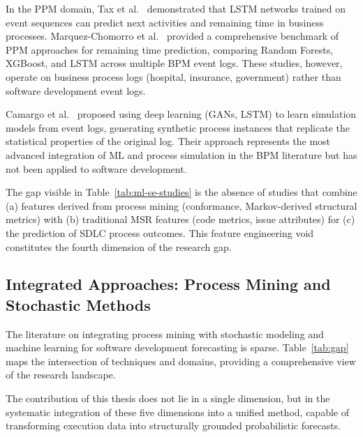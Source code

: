 In the PPM domain, Tax et al.~\cite{tax2017} demonstrated
that LSTM networks trained on event sequences can predict next activities
and remaining time in business processes. Marquez-Chomorro et
al.~\cite{marquezChamorro2018} provided a comprehensive
benchmark of PPM approaches for remaining time prediction, comparing
Random Forests, XGBoost, and LSTM across multiple BPM event logs.
These studies, however, operate on business process logs (hospital,
insurance, government) rather than software development event logs.

Camargo et al.~\cite{camargo2022learning} proposed using deep learning
(GANs, LSTM) to learn simulation models from event logs, generating
synthetic process instances that replicate the statistical properties
of the original log. Their approach represents the most advanced
integration of ML and process simulation in the BPM literature but has
not been applied to software development.

The gap visible in Table~\ref{tab:ml-se-studies} is the absence of
studies that combine (a) features derived from process mining
(conformance, Markov-derived structural metrics) with (b) traditional
MSR features (code metrics, issue attributes) for (c) the prediction of
SDLC process outcomes. This feature engineering void constitutes the
fourth dimension of the research gap.


\subsection{Integrated Approaches: Process Mining and Stochastic Methods}
\label{sec:rw-integrated}

The literature on integrating process mining with stochastic modeling
and machine learning for software development forecasting is sparse.
Table~\ref{tab:gap} maps the intersection of techniques and domains,
providing a comprehensive view of the research landscape.

The contribution of this thesis does not lie in a single dimension, but in the systematic integration of these five dimensions into a unified method, capable of transforming execution data into structurally grounded probabilistic forecasts.


